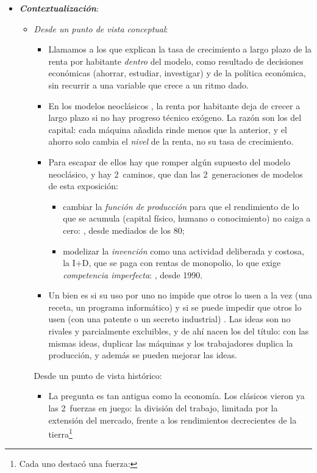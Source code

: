 \documentclass[11pt]{article}
\begin{document}
\begin{itemize}
\item \textbf{\emph{Contextualización}}:
  \begin{itemize}
  \item \emph{Desde un punto de vista conceptual}:
  \begin{itemize}
  \item Llamamos  a los que explican la tasa de crecimiento a largo plazo de la renta por habitante \emph{dentro} del modelo, como resultado de decisiones económicas (ahorrar, estudiar, investigar) y de la política económica, sin recurrir a una variable que crece a un ritmo dado.
  \item En los modelos neoclásicos , la renta por habitante deja de crecer a largo plazo si no hay progreso técnico exógeno. La razón son los  del capital: cada máquina añadida rinde menos que la anterior, y el ahorro solo cambia el \emph{nivel} de la renta, no su tasa de crecimiento.
  \item Para escapar de ellos hay que romper algún supuesto del modelo neoclásico, y hay 2~caminos, que dan las 2~generaciones de modelos de esta exposición:
    \begin{itemize}
    \item cambiar la \emph{función de producción} para que el rendimiento de lo que se acumula (capital físico, humano o conocimiento) no caiga a cero: , desde mediados de los 80;
    \item modelizar la \emph{invención} como una actividad deliberada y costosa, la I+D, que se paga con rentas de monopolio, lo que exige \emph{competencia imperfecta}: , desde 1990.
    \end{itemize}
  \item Un bien es  si su uso por uno no impide que otros lo usen a la vez (una receta, un programa informático) y  si se puede impedir que otros lo usen (con una patente o un secreto industrial) . Las ideas son no rivales y parcialmente excluibles, y de ahí nacen los  del título: con las mismas ideas, duplicar las máquinas y los trabajadores duplica la producción, y además se pueden mejorar las ideas\nocite{Romer1990}.
  \end{itemize}
  Desde un punto de vista histórico:
  \begin{itemize}
  \item La pregunta es tan antigua como la economía. Los clásicos vieron ya las 2~fuerzas en juego: la división del trabajo, limitada por la extensión del mercado, frente a los rendimientos decrecientes de la tierra\footnote{Cada uno destacó una fuerza:
}
\end{itemize}
\end{itemize}
\end{itemize}
\end{document}
